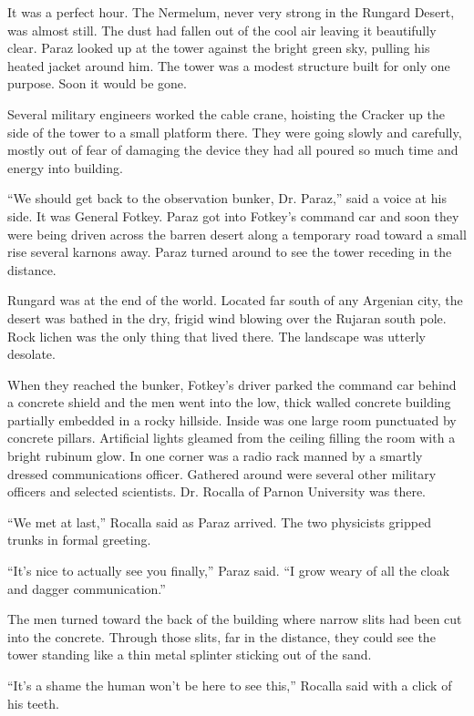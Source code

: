 
It was a perfect hour. The Nermelum, never very strong in the Rungard Desert, was almost still.
The dust had fallen out of the cool air leaving it beautifully clear. Paraz looked up at the
tower against the bright green sky, pulling his heated jacket around him. The tower was a modest
structure built for only one purpose. Soon it would be gone.

Several military engineers worked the cable crane, hoisting the Cracker up the side of the tower
to a small platform there. They were going slowly and carefully, mostly out of fear of damaging
the device they had all poured so much time and energy into building.

``We should get back to the observation bunker, Dr. Paraz,'' said a voice at his side. It was
General Fotkey. Paraz got into Fotkey's command car and soon they were being driven across the
barren desert along a temporary road toward a small rise several karnons away. Paraz turned
around to see the tower receding in the distance.

Rungard was at the end of the world. Located far south of any Argenian city, the desert was
bathed in the dry, frigid wind blowing over the Rujaran south pole. Rock lichen was the only
thing that lived there. The landscape was utterly desolate.

When they reached the bunker, Fotkey's driver parked the command car behind a concrete shield
and the men went into the low, thick walled concrete building partially embedded in a rocky
hillside. Inside was one large room punctuated by concrete pillars. Artificial lights gleamed
from the ceiling filling the room with a bright rubinum glow. In one corner was a radio rack
manned by a smartly dressed communications officer. Gathered around were several other military
officers and selected scientists. Dr. Rocalla of Parnon University was there.

``We met at last,'' Rocalla said as Paraz arrived. The two physicists gripped trunks in formal
greeting.

``It's nice to actually see you finally,'' Paraz said. ``I grow weary of all the cloak and
dagger communication.''

The men turned toward the back of the building where narrow slits had been cut into the
concrete. Through those slits, far in the distance, they could see the tower standing like a
thin metal splinter sticking out of the sand.

``It's a shame the human won't be here to see this,'' Rocalla said with a click of his teeth.

